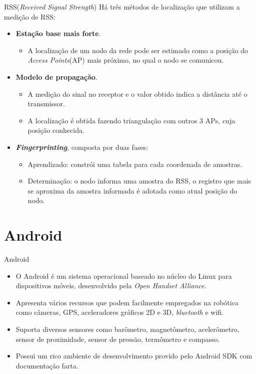 \documentclass{beamer}
\newlength{\wideitemsep}
\let\olditem\item
\renewcommand{\item}{\setlength{\itemsep}{\wideitemsep}\olditem}
\begin{document}
\begin{frame}{RSS(\textit{Received Signal Strength})}
Há três métodos de localização que utilizam a medição de RSS:
\begin{itemize}
 \olditem \textbf{Estação base mais forte}.
 \begin{itemize}
  \item A localização de um nodo da rede pode ser estimado como a posição do \textit{Access Points}(AP) mais próximo, no 
	qual o nodo se comunicou.
 \end{itemize}

 \olditem \textbf{Modelo de propagação}.
  \begin{itemize}
  \item A medição do sinal no receptor e o valor obtido indica a distância até o transmissor.
  \item A localização é obtida fazendo triangulação com outros 3 APs, cuja posição conhecida.
 \end{itemize}
 \olditem \textbf{\textit{Fingerprinting}}, composta por duas fases:
  \begin{itemize}
  \item Aprendizado: constrói uma tabela para cada coordenada de amostras.
  \item Determinação: o nodo informa uma amostra do RSS, o registro que mais se aproxima da amostra informada é adotada como atual posição do nodo.
 \end{itemize}
\end{itemize}
\end{frame}


\section{Android} %
\begin{frame}{Android}
\begin{itemize}
\item O Android é um sistema operacional baseado no núcleo do Linux para dispositivos móveis, 
desenvolvido pela \textit{Open Handset Alliance}.

 \item Apresenta vários recursos que podem facilmente empregados na robótica como
câmeras, GPS, aceleradores gráficos 2D e 3D, \textit{bluetooth} e wifi.

\item Suporta diversos sensores como barômetro, magnetômetro, acelerômetro, 
 sensor de proximidade, sensor de pressão, termômetro e compasso. 
 
 \item Possui um rico ambiente de desenvolvimento provido pelo Android SDK com documentação farta.

\end{itemize}
\end{frame}
\end{document}
